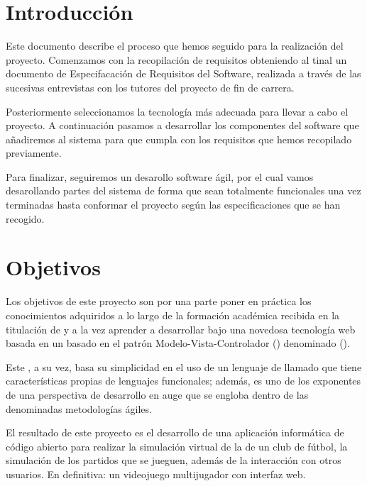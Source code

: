

\section{Introducción}

Este documento describe el proceso que hemos seguido para la realización del
proyecto.  Comenzamos con la recopilación de requisitos obteniendo al tinal un
documento de Especifacación de Requisitos del Software, realizada a través de
las sucesivas entrevistas con los tutores del proyecto de fin de carrera.

Posteriormente seleccionamos la tecnología más adecuada para llevar a cabo el
proyecto. A continuación pasamos a desarrollar los componentes del software que
añadiremos al sistema para que cumpla con los requisitos que hemos recopilado
previamente.

Para finalizar, seguiremos un desarollo software ágil, por el cual vamos
desarollando partes del sistema de forma que sean totalmente funcionales una vez
terminadas hasta conformar el proyecto según las especificaciones que se han
recogido.

\section{Objetivos}

Los objetivos de este proyecto son por una parte poner en práctica los
conocimientos adquiridos a lo largo de la formación académica recibida en la
titulación de  y a la vez
aprender a desarrollar bajo una novedosa tecnología web basada en un
 basado en el patrón Modelo-Vista-Controlador ()
denominado  ().

Este , a su vez, basa su simplicidad en el uso de un
lenguaje de  llamado  que tiene características
propias de lenguajes funcionales; además, es uno de los exponentes de una
perspectiva de desarrollo en auge que se engloba dentro de las denominadas
metodologías ágiles.

El resultado de este proyecto es el desarrollo de una aplicación informática
 de código abierto para realizar la simulación virtual de la
 de un club de fútbol, la simulación de los
partidos que se jueguen, además de la interacción con otros usuarios. En
definitiva: un videojuego multijugador con interfaz web.

